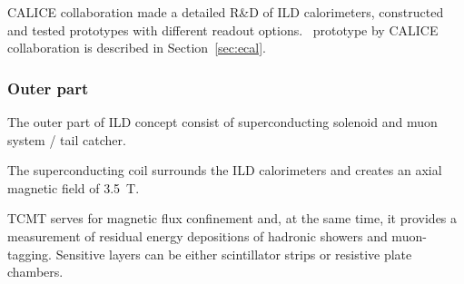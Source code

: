 CALICE collaboration made a detailed R\&D of ILD calorimeters, constructed and tested prototypes with different readout options. 
\ecal\ prototype by CALICE collaboration is described in Section~\ref{sec:ecal}.


\subsubsection{Outer part}

The outer part of ILD concept consist of superconducting solenoid and muon system / tail catcher. 

The superconducting coil surrounds the ILD calorimeters and creates an axial magnetic field of 3.5~T.

TCMT serves for magnetic flux confinement and, at the same time, it provides a measurement of residual energy depositions of hadronic showers and muon-tagging. Sensitive layers can be either scintillator strips or resistive plate chambers. 


